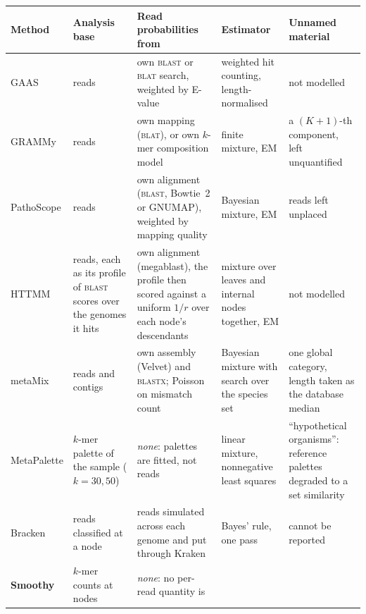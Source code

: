 \documentclass[pdflatex,sn-vancouver-num]{sn-jnl}
\begin{document}
    \begin{table}[!htbp]
        \centering
        \footnotesize
        \setlength{\tabcolsep}{3.5pt}
        \begin{tabular}{@{}l|p{2.0cm}|p{2.2cm}|p{2.6cm}|p{3.0cm}@{}}
            \textbf{Method} & \textbf{Analysis base} & \textbf{Read probabilities from} &
                \textbf{Estimator} & \textbf{Unnamed material}\\
            \hline
            GAAS \citep{gaas} & reads & own \textsc{blast} or \textsc{blat} search, weighted by
                E-value &
                weighted hit counting, length-normalised & not modelled\\
            GRAMMy \citep{grammy} & reads & own mapping (\textsc{blat}), or own $k$-mer composition
                model &
                finite mixture, EM & a $(K{+}1)$-th component, left unquantified\\
            PathoScope \citep{pathoscope} & reads & own alignment (\textsc{blast}, Bowtie~2 or
                GNUMAP), weighted by mapping quality &
                Bayesian mixture, EM & reads left unplaced\\
            HTTMM \citep{httmm} & reads, each as its profile of \textsc{blast} scores over the
                genomes it hits &
                own alignment (megablast), the profile then scored against a uniform $1/r$ over each
                node's descendants &
                mixture over leaves and internal nodes together, EM & not modelled\\
            metaMix \citep{metamix} & reads and contigs & own assembly (Velvet) and
                \textsc{blastx}; Poisson on mismatch count &
                Bayesian mixture with search over the species set & one global category, length taken
                as the database median\\
            MetaPalette \citep{metapalette} & $k$-mer palette of the sample ($k=30,50$) &
                \emph{none}: palettes are fitted, not reads & linear mixture, nonnegative least
                squares & \enquote{hypothetical organisms}: reference palettes degraded to a set
                similarity\\
            Bracken \citep{lu2017bracken} & reads classified at a node & reads simulated across each
                genome and put through Kraken &
                Bayes' rule, one pass & cannot be reported\\
            \textbf{Smoothy} & $k$-mer counts at nodes & \emph{none}: no per-read quantity is

\end{tabular}
\end{table}
\end{document}

